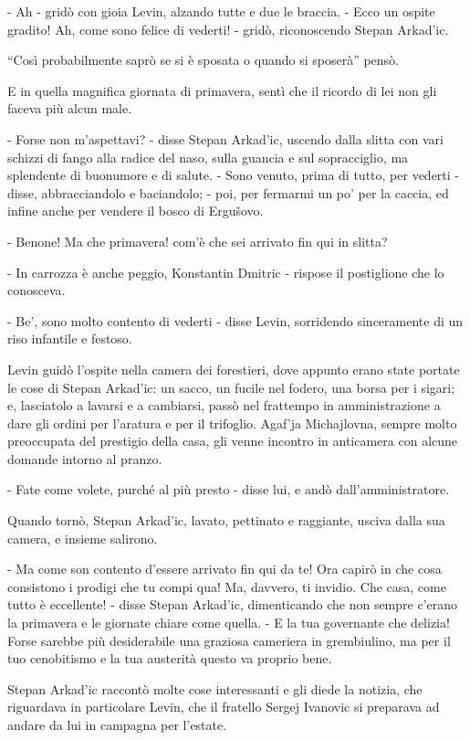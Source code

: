 - Ah - gridò con gioia Levin, alzando tutte e due le braccia. - Ecco un ospite gradito! Ah, come sono felice di vederti! - gridò, riconoscendo Stepan Arkad'ic. 

``Così probabilmente saprò se si è sposata o quando si sposerà'' pensò. 

E in quella magnifica giornata di primavera, sentì che il ricordo di lei non gli faceva più alcun male. 

- Forse non m'aspettavi? - disse Stepan Arkad'ic, uscendo dalla slitta con vari schizzi di fango alla radice del naso, sulla guancia e sul sopracciglio, ma splendente di buonumore e di salute. - Sono venuto, prima di tutto, per vederti - disse, abbracciandolo e baciandolo; - poi, per fermarmi un po' per la caccia, ed infine anche per vendere il bosco di Ergušovo. 

- Benone! Ma che primavera! com'è che sei arrivato fin qui in slitta? 

- In carrozza è anche peggio, Konstantin Dmitric - rispose il postiglione che lo conosceva. 

- Be', sono molto contento di vederti - disse Levin, sorridendo sinceramente di un riso infantile e festoso. 

Levin guidò l'ospite nella camera dei forestieri, dove appunto erano state portate le cose di Stepan Arkad'ic: un sacco, un fucile nel fodero, una borsa per i sigari; e, lasciatolo a lavarsi e a cambiarsi, passò nel frattempo in amministrazione a dare gli ordini per l'aratura e per il trifoglio. Agaf'ja Michajlovna, sempre molto preoccupata del prestigio della casa, gli venne incontro in anticamera con alcune domande intorno al pranzo. 

- Fate come volete, purché al più presto - disse lui, e andò dall'amministratore. 

Quando tornò, Stepan Arkad'ic, lavato, pettinato e raggiante, usciva dalla sua camera, e insieme salirono. 

- Ma come son contento d'essere arrivato fin qui da te! Ora capirò in che cosa consistono i prodigi che tu compi qua! Ma, davvero, ti invidio. Che casa, come tutto è eccellente! - disse Stepan Arkad'ic, dimenticando che non sempre c'erano la primavera e le giornate chiare come quella. - E la tua governante che delizia! Forse sarebbe più desiderabile una graziosa cameriera in grembiulino, ma per il tuo cenobitismo e la tua austerità questo va proprio bene. 

Stepan Arkad'ic raccontò molte cose interessanti e gli diede la notizia, che riguardava in particolare Levin, che il fratello Sergej Ivanovic si preparava ad andare da lui in campagna per l'estate. 


